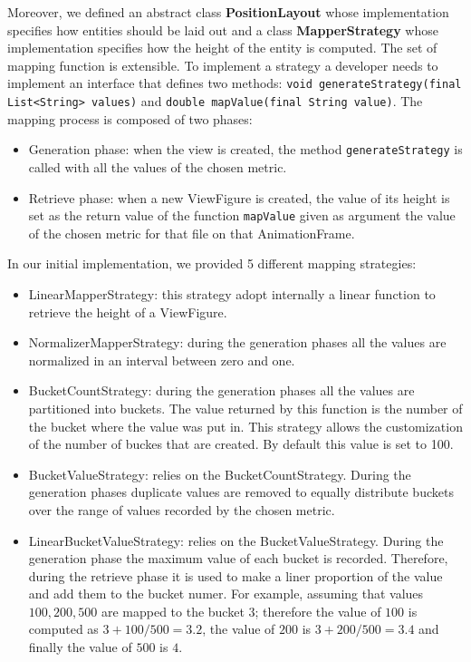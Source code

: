 Moreover, we defined an abstract class \textbf{PositionLayout} whose implementation specifies how entities should be laid out and a class \textbf{MapperStrategy} whose implementation specifies how the height of the entity is computed. The set of mapping function is extensible. To implement a strategy a developer needs to implement an interface that defines two methods: \texttt{void generateStrategy(final List<String> values)} and \texttt{double mapValue(final String value)}. The mapping process is composed of two phases:
\begin{itemize}
    \item Generation phase: when the view is created, the method \texttt{generateStrategy} is called with all the values of the chosen metric. 
    \item Retrieve phase: when a new ViewFigure is created, the value of its height is set as the return value of the function \texttt{mapValue} given as argument the value of the chosen metric for that file on that AnimationFrame. 
\end{itemize}

In our initial implementation, we provided 5 different mapping strategies:
\begin{itemize}
    \item LinearMapperStrategy: this strategy adopt internally a linear function to retrieve the height of a ViewFigure. 
    \item NormalizerMapperStrategy: during the generation phases all the values are normalized in an interval between zero and one.

    \item BucketCountStrategy: during the generation phases all the values are partitioned into buckets. The value returned by this function is the number of the bucket where the value was put in. This strategy allows the customization of the number of buckes that are created. By default this value is set to 100. 
    \item BucketValueStrategy: relies on the BucketCountStrategy. During the generation phases duplicate values are removed to equally distribute buckets over the range of values recorded by the chosen metric. 

    \item LinearBucketValueStrategy: relies on the BucketValueStrategy. During the generation phase the maximum  value of each bucket is recorded. Therefore, during the retrieve phase it is used to make a liner proportion of the value and add them to the bucket numer. For example, assuming that values $100, 200, 500$ are mapped to the bucket $3$; therefore the value of $100$ is computed as $3 + 100/500 = 3.2$, the value of $200$ is $3 + 200/500 = 3.4$ and finally the value of $500$ is $4$.
\end{itemize}



